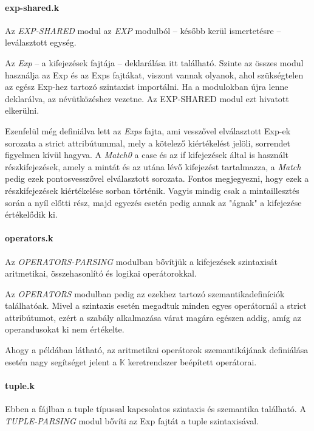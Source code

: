 \paragraph{exp-shared.k}
Az \textit{EXP-SHARED} modul az \textit{EXP} modulból -- később kerül ismertetésre -- leválasztott egység.



Az \textit{Exp} -- a kifejezések fajtája -- deklarálása itt található. Szinte az összes modul használja az Exp és az Exps fajtákat, viszont vannak olyanok, ahol szükségtelen az egész Exp-hez tartozó szintaxist importálni. Ha a modulokban újra lenne deklarálva, az névütközéshez vezetne. Az EXP-SHARED modul ezt hivatott elkerülni.

Ezenfelül még definiálva lett az \textit{Exps} fajta, ami vesszővel elválasztott Exp-ek sorozata a strict attribútummal, mely a kötelező kiértékelést jelöli, sorrendet figyelmen kívül hagyva. A \textit{Match0} a case és az if kifejezések által is használt részkifejezések, amely a mintát és az utána lévő kifejezést tartalmazza, a \textit{Match} pedig ezek pontosvesszővel elválasztott sorozata. Fontos megjegyezni, hogy ezek a részkifejezések kiértékelése sorban történik. Vagyis mindig csak a mintaillesztés során a nyíl előtti rész, majd egyezés esetén pedig annak az "ágnak" a kifejezése értékelődik ki.

\paragraph{operators.k}
Az \textit{OPERATORS-PARSING} modulban bővítjük a kifejezések szintaxisát aritmetikai, összehasonlító és logikai operátorokkal.



Az \textit{OPERATORS} modulban pedig az ezekhez tartozó szemantikadefiníciók találhatóak. Mivel a szintaxis esetén megadtuk minden egyes operátornál a strict attribútumot, ezért a szabály alkalmazása várat magára egészen addig, amíg az operandusokat ki nem értékelte.



Ahogy a példában látható, az aritmetikai operátorok szemantikájának definiálása esetén nagy segítséget jelent a $\mathbb{K}$ keretrendszer beépített operátorai.

\paragraph{tuple.k}
Ebben a fájlban a tuple típussal kapcsolatos szintaxis és szemantika található. A \textit{TUPLE-PARSING} modul bővíti az Exp fajtát a tuple szintaxisával.

